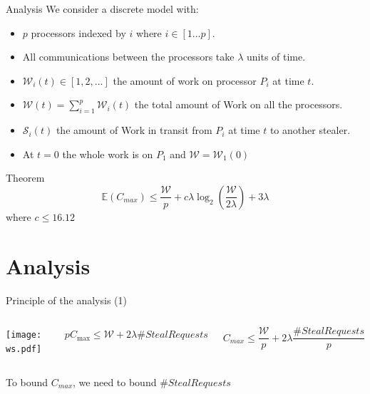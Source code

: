 \documentclass{beamer}
\begin{document}
\begin{frame}{Analysis}
    We consider a discrete model with: 
    \begin{itemize}
        \item $p$ processors indexed by $i$ where  $i \in [1...p]$.
        \item All communications between the processors take $\lambda$ units of time.
        \item $\mathcal{W}_i(t) \in [1,2,...]$ the amount of work on processor $P_i$ at time $t$.
        \item $\mathcal{W}(t) = \sum_{i=1}^{p} \mathcal{W}_i(t)$ the total amount of Work on all the processors. 
        \item $\mathcal{S}_i(t)$ the amount of Work in transit from $P_i$ at time $t$ to another stealer. 
        \item At $t=0$ the whole work is on $P_1$ and $\mathcal{W} = \mathcal{W}_1(0)$ 
    \end{itemize}
    \bigskip
    
    \begin{block}{Theorem}
        \begin{equation*}   
            \mathbb{E}(C_{max}) \leq \frac{\mathcal{W}}{p} +  c\lambda\log_2(\frac{\mathcal{W}}{2\lambda}) + 3\lambda
        \end{equation*}             where $c \leq 16.12$ 
    \end{block}
\end{frame}

\section{Analysis}
\begin{frame}{Principle of the analysis (1)}
    \begin{columns} 
        \begin{center}
            \texttt{[image: ws.pdf]}
        \end{center}
        \begin{center} 
            $pC_{\max} \le \mathcal{W} + 2\lambda\#\textit{StealRequests}$
        \end{center} 
        \begin{equation}
            C_{max}  \leq \frac{\mathcal{W}}{p} + 2\lambda\frac{\#StealRequests}{p}
        \end{equation} 
    \end{columns} 
    \begin{center}
    To bound \alert{$C_{max}$}, we need to bound \alert{$\#StealRequests$}
    \end{center}
\end{frame}
\end{document}
